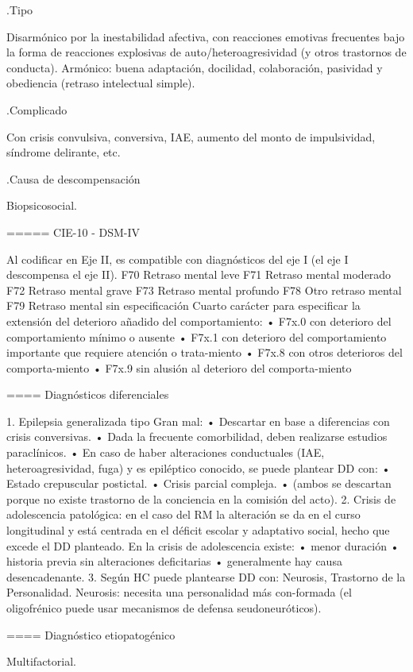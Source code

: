 \documentclass[encares.tex]{subfiles}
\begin{document}
.Tipo

Disarmónico por la inestabilidad afectiva, con reacciones emotivas frecuentes bajo la forma de reacciones explosivas de auto/heteroagresividad (y otros trastornos de conducta). Armónico: buena adaptación, docilidad, colaboración, pasividad y obediencia (retraso intelectual simple).

.Complicado

Con crisis convulsiva, conversiva, IAE, aumento del monto de impulsividad, síndrome delirante, etc.

.Causa de descompensación

Biopsicosocial.

===== CIE-10 - DSM-IV

Al codificar en Eje II, es compatible con diagnósticos del eje I (el eje I descompensa el eje II). F70 Retraso mental leve F71 Retraso mental moderado F72 Retraso mental grave F73 Retraso mental profundo F78 Otro retraso mental F79 Retraso mental sin especificación Cuarto carácter para especificar la extensión del deterioro añadido del comportamiento: • F7x.0 con deterioro del comportamiento mínimo o ausente • F7x.1 con deterioro del comportamiento importante que requiere atención o trata-miento • F7x.8 con otros deterioros del comporta-miento • F7x.9 sin alusión al deterioro del comporta-miento

==== Diagnósticos diferenciales

1. Epilepsia generalizada tipo Gran mal: • Descartar en base a diferencias con crisis conversivas. • Dada la frecuente comorbilidad, deben realizarse estudios paraclínicos. • En caso de haber alteraciones conductuales (IAE, heteroagresividad, fuga) y es epiléptico conocido, se puede plantear DD con: • Estado crepuscular postictal. • Crisis parcial compleja. • (ambos se descartan porque no existe trastorno de la conciencia en la comisión del acto).
2. Crisis de adolescencia patológica: en el caso del RM la alteración se da en el curso longitudinal y está centrada en el déficit escolar y adaptativo social, hecho que excede el DD planteado. En la crisis de adolescencia existe: • menor duración • historia previa sin alteraciones deficitarias • generalmente hay causa desencadenante.
3. Según HC puede plantearse DD con: Neurosis, Trastorno de la Personalidad. Neurosis: necesita una personalidad más con-formada (el oligofrénico puede usar mecanismos de defensa seudoneuróticos).

==== Diagnóstico etiopatogénico

Multifactorial.
\end{document}
